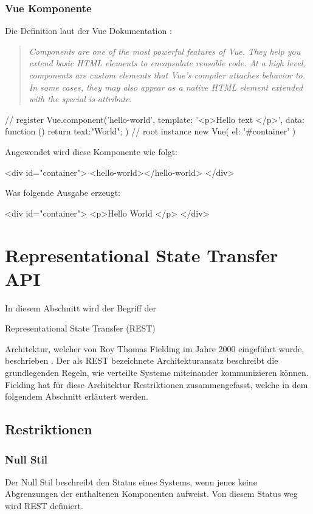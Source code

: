 \subsubsection{Vue Komponente}
Die Definition laut der Vue Dokumentation \cite{vue-component}: 
\begin{quote}
	\begin{english}
		\textit{Components are one of the most powerful features of Vue. They help you extend basic HTML elements to encapsulate reusable code. At a high level, components are custom elements that Vue’s compiler attaches behavior to. In some cases, they may also appear as a native HTML element extended with the special is attribute.}
	\end{english}
\end{quote}

\begin{JsCode}
	// register
	Vue.component('hello-world', {
		template: '<p>Hello {{ text }} </p>',
		data: function () {
			return {text:"World"};
		}
	})
	// root instance
	new Vue({
		el: '#container'
	})
\end{JsCode}
Angewendet wird diese Komponente wie folgt:
\begin{JsCode}[numbers=none]
	<div id="container">
	<hello-world></hello-world>
	</div>
\end{JsCode}
Was folgende Ausgabe erzeugt:
\begin{JsCode}[numbers=none]
	<div id="container">
	<p>Hello World </p>
	</div>
\end{JsCode}

\section{Representational State Transfer  API}
In diesem Abschnitt wird der Begriff der \begin{english}
Representational State Transfer (REST)
\end{english} Architektur, welcher von Roy Thomas Fielding im Jahre 2000 eingeführt wurde, beschrieben \cite{rest}.
Der als REST bezeichnete Architekturansatz beschreibt die grundlegenden Regeln, wie verteilte Systeme miteinander kommunizieren können.
Fielding hat für diese Architektur Restriktionen zusammengefasst, welche in dem folgendem Abschnitt erläutert werden.
\subsection{Restriktionen}
\subsubsection{Null Stil}
Der Null Stil beschreibt den Status eines Systems, wenn jenes keine Abgrenzungen der enthaltenen Komponenten aufweist. Von diesem Status weg wird REST definiert. 
